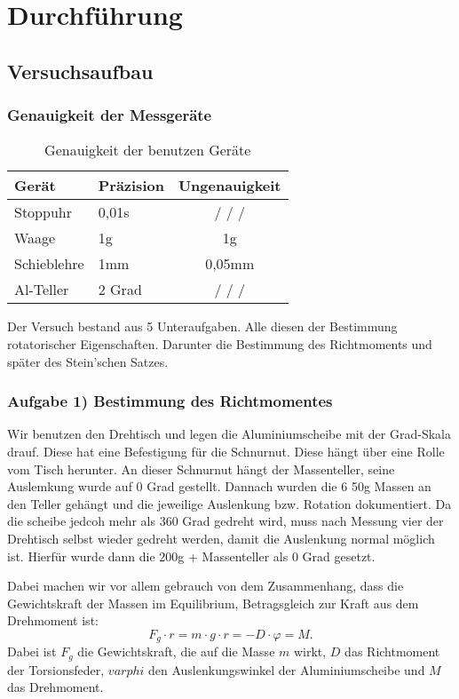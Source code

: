 \chapter{Durchführung}

\section{Versuchsaufbau}

\subsection*{Genauigkeit der Messgeräte}
\begin{table}[h!]
    \centering
    \begin{tabular}{l | l | c}
    Gerät & Präzision & Ungenauigkeit \\
    \hline
    Stoppuhr        & 0,01s     & / / / \\
    Waage           & 1g        & 1g \\
    Schieblehre     & 1mm       & 0,05mm \\
    Al-Teller       & 2 Grad    & / / / \\
    \hline
    \end{tabular}
    \caption{Genauigkeit der benutzen Geräte \cite{Stoppuhr,Waage}}
    \label{tab:genauigkeit_der_geräte}
\end{table}

Der Versuch bestand aus 5 Unteraufgaben. Alle diesen der Bestimmung rotatorischer Eigenschaften. 
Darunter die Bestimmung des Richtmoments und später des Stein'schen Satzes.
\subsection*{Aufgabe 1) Bestimmung des Richtmomentes}
Wir benutzen den Drehtisch und legen die Aluminiumscheibe mit der Grad-Skala drauf.
Diese hat eine Befestigung für die Schnurnut. Diese hängt über eine Rolle vom Tisch herunter. 
An dieser Schnurnut hängt der Massenteller, seine Auslemkung wurde auf 0 Grad gestellt.
Dannach wurden die 6 50g Massen an den Teller gehängt und die jeweilige Auslenkung bzw. Rotation dokumentiert.
Da die scheibe jedcoh mehr als 360 Grad gedreht wird, muss nach Messung vier der Drehtisch selbst wieder gedreht werden, 
damit die Auslenkung normal möglich ist. Hierfür wurde dann die 200g + Massenteller als 0 Grad gesetzt.

Dabei machen wir vor allem gebrauch von dem Zusammenhang, dass die Gewichtskraft der Massen im Equilibrium, Betragsgleich zur Kraft aus dem Drehmoment ist:
\begin{equation}
    F_g \cdot r = m \cdot g \cdot r = -D \cdot \varphi = M.
\end{equation}
\label{eq:gleichgewichts_zustand}
Dabei ist $F_g$ die Gewichtskraft, die auf die Masse $m$ wirkt, $D$ das Richtmoment der Torsionsfeder, $varphi$ den Auslenkungswinkel der Aluminiumscheibe und $M$ das Drehmoment.

